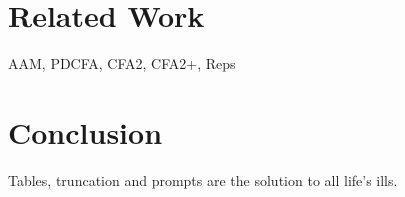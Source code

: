 \documentclass{llncs}
\begin{document}

\section{Related Work}

AAM, PDCFA, CFA2, CFA2+, Reps

\section{Conclusion}

Tables, truncation and prompts are the solution to all life's ills.



\end{document}
